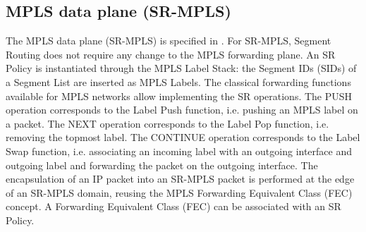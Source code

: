 \subsection{MPLS data plane (SR-MPLS)}
\label{sec:mpls-data plane}

The MPLS data plane (SR-MPLS) is specified in \cite{id-segment-routing-mpls}. For SR-MPLS, Segment Routing does not require any change to the MPLS forwarding plane. An SR Policy is instantiated through the MPLS Label Stack: the Segment IDs (SIDs) of a Segment List are inserted as MPLS Labels. 
The classical forwarding functions available for MPLS networks allow implementing the SR operations. The PUSH operation corresponds to the Label Push function, i.e. pushing an MPLS label on a packet. The NEXT operation corresponds to the Label Pop function, i.e. removing the topmost label. The CONTINUE operation corresponds to the Label Swap function, i.e. associating an incoming label with an outgoing interface and outgoing label and forwarding the packet on the outgoing interface. 
The encapsulation of an IP packet into an SR-MPLS packet is performed at the edge of an SR-MPLS domain, reusing the MPLS Forwarding Equivalent Class (FEC) concept. A Forwarding Equivalent Class (FEC) can be associated with an SR Policy.

